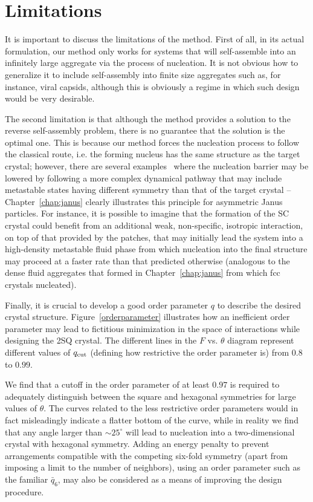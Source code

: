 \section{Limitations}\label{sec:limitations}
It is important to discuss the limitations of the method.
First of all, in its actual formulation, our method only works for systems  that will self-assemble into an infinitely large aggregate via the process of nucleation.
It is not obvious how to generalize it to include self-assembly into finite size aggregates such as, for instance, viral capsids, although this is obviously a regime in which such design would be very desirable.

The second limitation is that although the method provides a solution to the reverse self-assembly problem, there is no guarantee that the solution is the optimal one.
This is because our method forces the  nucleation process to follow the classical route, i.e. the forming nucleus has the same structure as the  target crystal; however, there are several examples~\cite{tenwolde,cacciuto22,whitelam,kumar} where the nucleation barrier may be lowered by following a more complex dynamical pathway that may include metastable states having different symmetry than that of the target crystal -- Chapter~\ref{chap:janus} clearly illustrates this principle for asymmetric Janus particles.
For instance, it is possible to imagine that the formation of the SC crystal could benefit from an additional weak, non-specific, isotropic interaction, on top of that provided by the patches, that may initially lead the system into a high-density metastable fluid phase from which nucleation into the final structure may proceed at a faster rate than that predicted otherwise (analogous to the dense fluid aggregates that formed in Chapter~\ref{chap:janus} from which fcc crystals nucleated).

Finally, it is crucial to develop a good order parameter $q$ to describe the desired crystal structure.   
Figure~\ref{orderparameter} illustrates how an inefficient order parameter may lead to fictitious minimization in the space of interactions while designing the 2SQ crystal.
The different lines in the $F$ vs. $\theta$ diagram represent different values of $q_{\rm cut}$ (defining how restrictive the order parameter is) from $0.8$ to $0.99$.

We find that a cutoff in the order parameter of at least $0.97$ is required to adequately distinguish between the square and hexagonal symmetries for large values of $\theta$.
The curves related to the less restrictive order parameters would in fact misleadingly indicate a flatter bottom of the curve, while in reality we find that any angle larger than $\sim25^{\circ}$ will lead to nucleation into a two-dimensional crystal with hexagonal symmetry. 
Adding an energy penalty to  prevent arrangements compatible with the competing six-fold symmetry (apart from imposing a limit to the number of neighbors), using an order parameter such as the familiar $\bar q_6$, may also be considered as a means of improving the design procedure.

